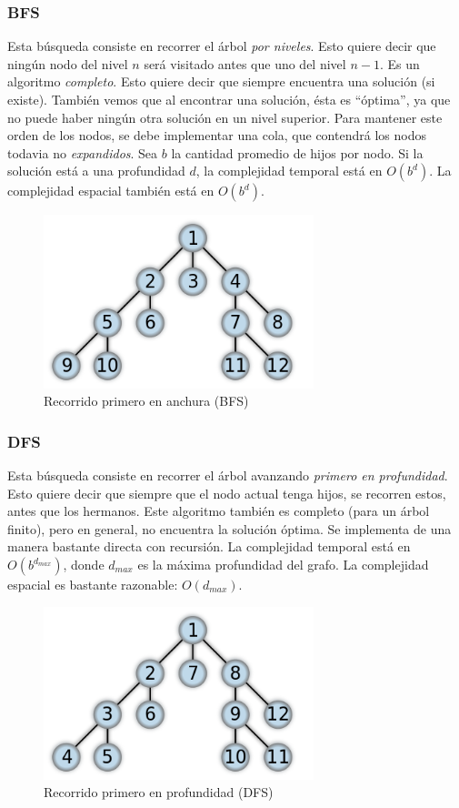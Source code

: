 \documentclass[11pt,a4paper]{article}
\begin{document}
\subsubsection{BFS}
Esta búsqueda consiste en recorrer el árbol \emph{por niveles}. Esto quiere decir que ningún nodo del nivel $n$ será visitado antes que uno del nivel $n-1$.
Es un algoritmo \emph{completo}. Esto quiere decir que siempre encuentra una solución (si existe). También vemos que al encontrar una solución, ésta es ``óptima'', ya que no puede haber ningún otra solución en un nivel superior.
Para mantener este orden de los nodos, se debe implementar una cola, que contendrá los nodos todavia no \emph{expandidos}.
Sea $b$ la cantidad promedio de hijos por nodo. Si la solución está a una profundidad $d$, la complejidad temporal está en $O(b^d)$. La complejidad espacial también está en $O(b^d)$.
{
\begin{figure}[h!]
  \centering
    \includegraphics[width=0.7\textwidth]{img/BFS}
  \caption{Recorrido primero en anchura (BFS)}
  \label{fig:BFS}
\end{figure}
}
\subsubsection{DFS}
Esta búsqueda consiste en recorrer el árbol avanzando \emph{primero en profundidad}. Esto quiere decir que siempre que el nodo actual tenga hijos, se recorren estos, antes que los hermanos.
Este algoritmo también es completo (para un árbol finito), pero en general, no encuentra la solución óptima. Se implementa de una manera bastante directa con recursión. La complejidad temporal está en $O(b^{d_{max}})$, donde $d_{max}$ es la máxima profundidad del grafo. La complejidad espacial es bastante razonable: $O(d_{max})$.

{
\begin{figure}[h!]
  \centering
    \includegraphics[width=0.7\textwidth]{img/DFS}
  \caption{Recorrido primero en profundidad (DFS)}
  \label{fig:DFS}
\end{figure}
}
\end{document}
